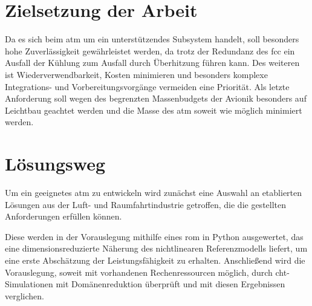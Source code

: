 \section{Zielsetzung der Arbeit}

Da es sich beim \ac{atm} um ein unterstützendes Subsystem handelt, soll besonders hohe Zuverlässigkeit gewährleistet werden, da trotz der
Redundanz des \ac{fcc} ein Ausfall der Kühlung zum Ausfall durch Überhitzung führen kann.
Des weiteren ist Wiederverwendbarkeit, Kosten minimieren und besonders komplexe Integrations- und Vorbereitungsvorgänge
vermeiden eine Priorität.
Als letzte Anforderung soll wegen des begrenzten Massenbudgets der Avionik
besonders auf Leichtbau geachtet werden und die Masse des \ac{atm} soweit wie möglich minimiert werden.

\section{Lösungsweg}

Um ein geeignetes \ac{atm} zu entwickeln wird zunächst eine Auswahl an etablierten Lösungen aus der Luft- und Raumfahrtindustrie
getroffen, die die gestellten Anforderungen erfüllen können.

Diese werden in der Vorauslegung mithilfe eines \ac{rom} in Python ausgewertet, das eine dimensionsreduzierte Näherung des nichtlinearen Referenzmodells liefert, um eine erste Abschätzung der Leistungsfähigkeit zu erhalten.
Anschließend wird die Vorauslegung, soweit mit vorhandenen Rechenressourcen möglich, durch \ac{cht}-Simulationen mit Domänenreduktion
überprüft und mit diesen Ergebnissen verglichen.